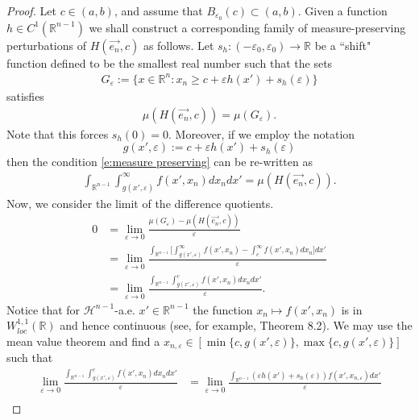 \documentclass[12pt]{amsart}
\numberwithin{equation}{section}
\theoremstyle{plain}
\theoremstyle{definition}
\begin{document}
\begin{proof}
    Let $c \in (a, b)$, and assume that $B_{\varepsilon_0}(c) \subset (a, b)$. Given a function $h \in C^1(\mathbb{R}^{n-1})$ we shall construct a corresponding family of measure-preserving perturbations of $H(\vec{e_n}, c)$ as follows. Let $s_h: (-\varepsilon_0, \varepsilon_0) \rightarrow \mathbb{R}$ be a ``shift" function defined to be the smallest real number such that the sets
    \begin{align*}
G_\varepsilon:= \{x\in \mathbb{R}^n: x_n \ge c+ \varepsilon h(x') + s_h(\varepsilon) \}\end{align*}
satisfies 
\begin{align}\label{e:measure preserving}
\mu(H(\vec{e_n}, c)) = \mu(G_{\varepsilon}).
\end{align}
Note that this forces $s_h(0)=0$.  Moreover, if we employ the notation 
$$g(x',\varepsilon):= c+ \varepsilon h(x') + s_h(\varepsilon)$$ 
then the condition \eqref{e:measure preserving} can be re-written as
\begin{align}\label{e:meas preserving formula}
\int_{\mathbb{R}^{n-1}}\int_{g(x', \varepsilon)}^{\infty}f(x', x_n)dx_n dx' = \mu(H(\vec{e_n}, c)).
\end{align}
Now, we consider the limit of the difference quotients.
\begin{align*}
0 & = \lim_{\varepsilon \rightarrow 0}\frac{\mu(G_{\varepsilon}) - \mu(H(\vec{e_n}, c))}{\varepsilon} \\
& = \lim_{\varepsilon \rightarrow 0}\frac{\int_{\mathbb{R}^{n-1}}\Big[\int_{g(x', \varepsilon)}^{\infty}f(x', x_n) - \int_{c}^{\infty}f(x', x_n)dx_n \Big] dx'}{\varepsilon}\\
& = \lim_{\varepsilon \rightarrow 0}\frac{\int_{\mathbb{R}^{n-1}}\int_{g(x', \varepsilon)}^{c}f(x', x_n)dx_ndx'}{\varepsilon}.
\end{align*}
Notice that for $\mathcal{H}^{n-1}$-a.e. $x' \in \mathbb{R}^{n-1}$ the function $x_n\mapsto f(x', x_n)$ is in $W^{1,1}_{loc}(\mathbb{R})$ and hence continuous (see, for example, \cite{brezis} Theorem 8.2). We may use the mean value theorem and find a $x_{n, \varepsilon} \in [\min\{c, g(x', \varepsilon)\}, \max\{c, g(x', \varepsilon)\}]$ such that
\begin{align*}
\lim_{\varepsilon \rightarrow 0}\frac{\int_{\mathbb{R}^{n-1}}\int_{g(x', \varepsilon)}^{c}f(x', x_n)dx_ndx'}{\varepsilon}
& = \lim_{\varepsilon \rightarrow 0}\frac{\int_{\mathbb{R}^{n-1}}(\varepsilon h(x') + s_h(\varepsilon))f(x', x_{n, \varepsilon})dx'}{\varepsilon}\\

\end{align*}
\end{proof}
\end{document}
